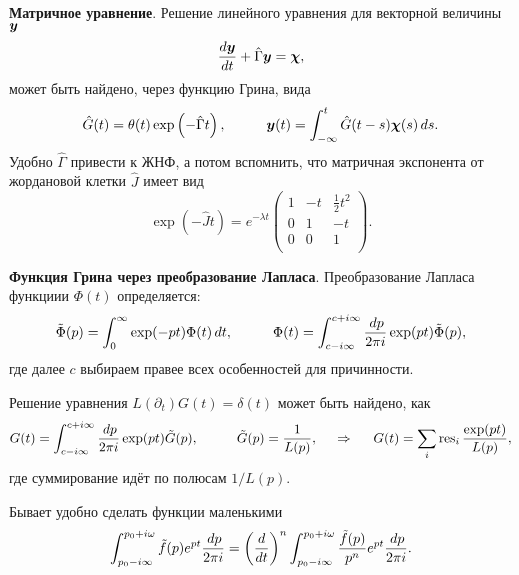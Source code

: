\textbf{Матричное уравнение}. Решение линейного уравнения для векторной величины $\mbox{\boldmath $y$}$
\begin{equation*}
    \frac{d \mbox{\boldmath $y$}}{d t} + \hat{\Gamma} \mbox{\boldmath $y$} = \mbox{\boldmath $\chi$},
\end{equation*}
может быть найдено, через функцию Грина, вида
\begin{equation}
    \hat{G} (t) = \theta(t) \exp\left(- \hat{\Gamma} t\right),
    \hspace{10 mm} 
    \vc{y}(t) = \int_{-\infty}^{t}  \hat{G}(t-s) \vc{\chi}(s) \d s.
\end{equation}
Удобно $\hat{\Gamma}$ привести к ЖНФ, а потом вспомнить, что матричная экспонента от жордановой клетки $\hat{J}$ имеет вид
\begin{equation*}
    \exp\left(- \hat{J} t\right) = e^{- \lambda t}
    \left(
    \begin{array}{ccc}
     1 & -t & \frac{1}{2}t^2 \\
     0 & 1 & -t \\
     0 & 0 & 1 \\
    \end{array}
    \right).
\end{equation*}




\textbf{Функция Грина через преобразование Лапласа}. Преобразование Лапласа функциии $\Phi(t)$ определяется:
\begin{equation*}
    \tilde{\Phi}(p) = \int_{0}^{\infty}  \exp(-pt) \Phi(t) \d t,
    \hspace{10 mm} 
    \Phi(t) = \int_{c-i \infty}^{c+i \infty} \frac{\d p}{2 \pi i} \exp(pt) \tilde{\Phi}(p),
\end{equation*}
где далее $c$ выбираем правее всех особенностей для причинности. 

Решение уравнения $L(\partial_t) G(t) = \delta(t)$ может быть найдено, как
\begin{equation}
    G(t) = \int_{c-i \infty}^{c+i \infty} \frac{\d p}{2 \pi i} \exp(p t) \tilde{G}(p),
    \hspace{10 mm} \tilde{G} (p) = \frac{1}{L(p)},
    \hspace{0.5cm} \Rightarrow \hspace{0.5cm}
    G(t) = \sum_i \res_i \frac{\exp(pt)}{L(p)},
\end{equation}
где суммирование идёт по полюсам $1/L(p)$. 

Бывает удобно сделать функции маленькими
\begin{equation*}
    \int_{p_0 - i \infty}^{p_0 + i \omega} \tilde{f}(p) e^{pt} \frac{\, d p}{2 \pi i} = 
    \left(\frac{d }{d t} \right)^n \int_{p_0 - i \infty}^{p_0 + i \omega} \frac{\tilde{f}(p)}{p^n} e^{pt} \frac{\, d p}{2 \pi i}.
\end{equation*}







